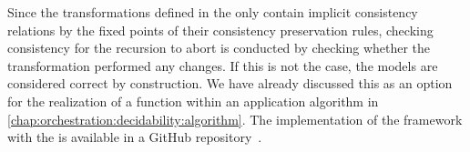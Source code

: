 Since the transformations defined in the \reactionslanguage only contain implicit consistency relations by the fixed points of their consistency preservation rules, checking consistency for the recursion to abort is conducted by checking whether the transformation performed any changes.
If this is not the case, the models are considered correct by construction.
We have already discussed this as an option for the realization of a  function within an application algorithm in \autoref{chap:orchestration:decidability:algorithm}.
The implementation of the framework with the \reactionslanguage is available in a GitHub repository~\cite{vitruvFrameworkGithub}.





